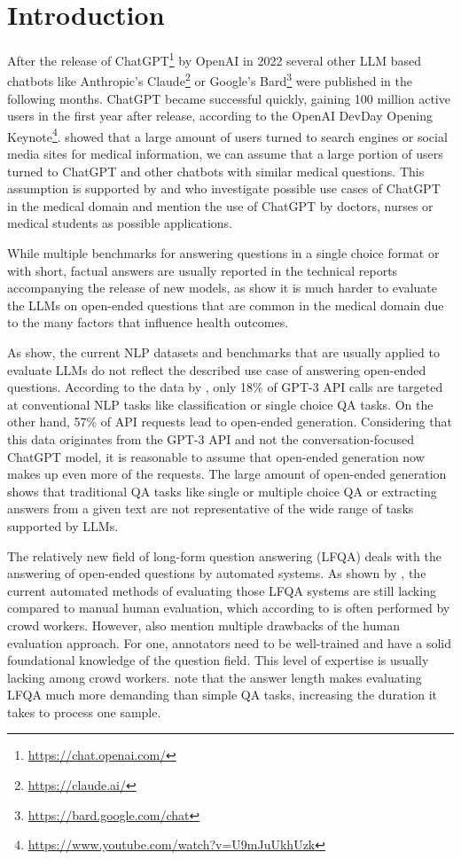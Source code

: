 \chapter{Introduction}\label{structure}
After the release of ChatGPT\footnote{\url{https://chat.openai.com/}} by OpenAI in 2022 several other LLM based chatbots like Anthropic's Claude\footnote{\url{https://claude.ai/}} or Google's Bard\footnote{\url{https://bard.google.com/chat}} were published in the following months.
ChatGPT became successful quickly, gaining 100 million active users in the first year after release, according to the OpenAI DevDay Opening Keynote\footnote{\url{https://www.youtube.com/watch?v=U9mJuUkhUzk}}.
\cite{de:2014:seeking} showed that a large amount of users turned to search engines or social media sites for medical information, we can assume that a large portion of users turned to ChatGPT and other chatbots with similar medical questions.
This assumption is supported by \cite{dave:2023:chatgpt} and \cite{khan:2023:chatgpt} who investigate possible use cases of ChatGPT in the medical domain and mention the use of ChatGPT by doctors, nurses or medical students as possible applications.

While multiple benchmarks for answering questions in a single choice format or with short, factual answers are usually reported in the technical reports accompanying the release of new models, as \cite{xu:2023:A} show it is much harder to evaluate the LLMs on open-ended questions that are common in the medical domain due to the many factors that influence health outcomes.

As \cite{ouyang:2022:Training} show, the current NLP datasets and benchmarks that are usually applied to evaluate LLMs do not reflect the described use case of answering open-ended questions.
According to the data by \cite{ouyang:2022:Training}, only 18\% of GPT-3 API calls are targeted at conventional NLP tasks like classification or single choice QA tasks.
On the other hand, 57\% of API requests lead to open-ended generation.
Considering that this data originates from the GPT-3 API and not the conversation-focused ChatGPT model, it is reasonable to assume that open-ended generation now makes up even more of the requests.
The large amount of open-ended generation shows that traditional QA tasks like single or multiple choice QA or extracting answers from a given text are not representative of the wide range of tasks supported by LLMs.

The relatively new field of long-form question answering (LFQA) deals with the answering of open-ended questions by automated systems.
As shown by \cite{xu:2023:A}, the current automated methods of evaluating those LFQA systems are still lacking compared to manual human evaluation, which according to \cite{xu:2023:A} is often performed by crowd workers.
However, \cite{xu:2023:A} also mention multiple drawbacks of the human evaluation approach.
For one, annotators need to be well-trained and have a solid foundational knowledge of the question field.
This level of expertise is usually lacking among crowd workers.
\cite{krishna:2021:Hurdles} note that the answer length makes evaluating LFQA much more demanding than simple QA tasks, increasing the duration it takes to process one sample.

